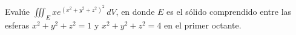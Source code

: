 \item Evalúe $\iiint_E x e^{(x^2+y^2+z^2)^2} \, dV$, en donde $E$ es el sólido comprendido entre las esferas $x^2 + y^2 + z^2 = 1$ y $x^2 + y^2 + z^2 = 4$ en el primer octante.
